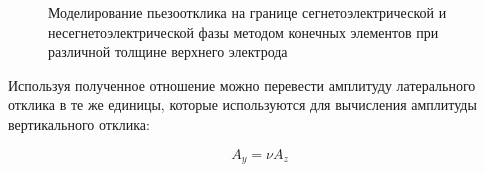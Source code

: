 \begin{figure}[ht]
    \caption[Этот текст попадает в названия рисунков в списке рисунков]{Моделирование пьезоотклика на границе сегнетоэлектрической и несегнетоэлектрической фазы методом конечных элементов при различной толщине верхнего электрода}\label{fig:comsol}
\end{figure}

Используя полученное отношение можно перевести амплитуду латерального отклика в те же единицы, которые используются для вычисления амплитуды вертикального отклика:

\[A_y = \nu A_z\]


